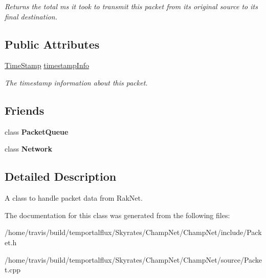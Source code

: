 \begin{DoxyCompactItemize}
\begin{DoxyCompactList}\small\item\em Returns the total ms it took to transmit this packet from its original source to its final destination. \end{DoxyCompactList}\end{DoxyCompactItemize}
\subsection*{Public Attributes}
\begin{DoxyCompactItemize}
\item 
\hypertarget{class_champ_net_1_1_packet_a0fcefd5ba56854e5a8e3e63a51e3963e}{\hyperlink{struct_champ_net_1_1_time_stamp}{Time\-Stamp} \hyperlink{class_champ_net_1_1_packet_a0fcefd5ba56854e5a8e3e63a51e3963e}{timestamp\-Info}}\label{class_champ_net_1_1_packet_a0fcefd5ba56854e5a8e3e63a51e3963e}

\begin{DoxyCompactList}\small\item\em The timestamp information about this packet. \end{DoxyCompactList}\end{DoxyCompactItemize}
\subsection*{Friends}
\begin{DoxyCompactItemize}
\item 
\hypertarget{class_champ_net_1_1_packet_ac3f1afb9cc164b535c73e6f5909519ff}{class {\bfseries Packet\-Queue}}\label{class_champ_net_1_1_packet_ac3f1afb9cc164b535c73e6f5909519ff}

\item 
\hypertarget{class_champ_net_1_1_packet_a88b59289ffd793fecd040d32e397b1e9}{class {\bfseries Network}}\label{class_champ_net_1_1_packet_a88b59289ffd793fecd040d32e397b1e9}

\end{DoxyCompactItemize}


\subsection{Detailed Description}
A class to handle packet data from Rak\-Net. 

The documentation for this class was generated from the following files\-:\begin{DoxyCompactItemize}
\item 
/home/travis/build/temportalflux/\-Skyrates/\-Champ\-Net/\-Champ\-Net/include/Packet.\-h\item 
/home/travis/build/temportalflux/\-Skyrates/\-Champ\-Net/\-Champ\-Net/source/Packet.\-cpp\end{DoxyCompactItemize}
